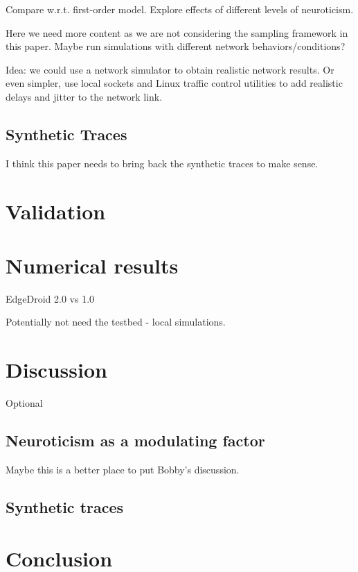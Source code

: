Compare w.r.t. first-order model.
Explore effects of different levels of neuroticism.

Here we need more content as we are not considering the sampling framework in this paper. Maybe run simulations with different network behaviors/conditions?

Idea: we could use a network simulator to obtain realistic network results. Or even simpler, use local sockets and Linux traffic control utilities to add realistic delays and jitter to the network link.

\subsection{Synthetic Traces}

I think this paper needs to bring back the synthetic traces to make sense.

\section{Validation}

\section{Numerical results}

EdgeDroid 2.0 vs 1.0

Potentially not need the testbed - local simulations.


\section{Discussion}

Optional

\subsection{Neuroticism as a modulating factor}

Maybe this is a better place to put Bobby's discussion.

\subsection{Synthetic traces}

\section{Conclusion}



